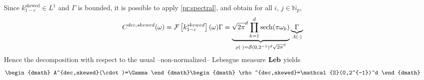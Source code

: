 Since $k^{\text{skewed}}_{1-c}\in L^1$ and $\Gamma$ is bounded, it is possible to apply \cref{pr:spectral}, and obtain for all $i$, $j\in\mathbb{N}_p$,
\begin{dmath*}
C^{dec,skewed}(\omega)
=\FT{k_{1-c}^{skewed}}(\omega)\Gamma
=\underbrace{\sqrt{2\pi}^d\prod_{k=1}^d\sech(\pi\omega_k)}_{\rho(\cdot)=\mathcal{S}(0,2^{-1})^d\sqrt{2\pi}^d}\underbrace{\Gamma}_{A(\cdot)}
\end{dmath*}
Hence the decomposition with respect to the usual --non-normalized-- Lebesgue measure $\mathbf{Leb}$ yields
\begin{dgroup}
\begin{dmath}
A^{dec,skewed}(\cdot)=\Gamma
\end{dmath}
\begin{dmath}
\rho^{dec,skewed}=\mathcal{S}(0,2^{-1})^d
\end{dmath}
\end{dgroup}
